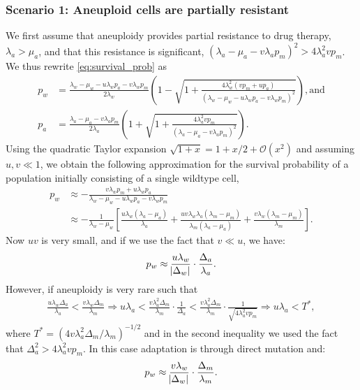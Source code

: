 \documentclass[12pt]{extarticle}
\begin{document}
\begin{appendices}
\subsubsection*{Scenario 1: Aneuploid cells are partially resistant} 

We first assume that aneuploidy provides partial resistance to drug therapy, $\lambda_a>\mu_a$, and that this resistance is significant, $\left(\lambda_a-\mu_a-v\lambda_ap_m\right)^2 > 4\lambda_a^2 v p_m$.
We thus rewrite \cref{eq:survival_prob} as
\begin{align*}
p_w&=\frac{\lambda_w-\mu_w-u\lambda_wp_a-v\lambda_wp_m}{2\lambda_w}\left(1-\sqrt{1+\frac{4\lambda_w^2\left(vp_m+up_a\right)}{\left(\lambda_w-\mu_w-u\lambda_wp_a-v\lambda_wp_m\right)^2}}\right) ,
\text{and} \\
p_a&=\frac{\lambda_a-\mu_a-v\lambda_ap_m}{2\lambda_a}\left(1+\sqrt{1+\frac{4\lambda_a^2vp_m}{\left(\lambda_a-\mu_a-v\lambda_ap_m\right)^2}}\right) . 
\end{align*}
Using the quadratic Taylor expansion $\sqrt{1+x}=1+x/2+\mathcal{O}(x^2)$ and assuming $u,v \ll 1$,
we obtain the following approximation for the survival probability of a population initially consisting of a single wildtype cell,
\begin{align} \label{eq:survprobwapprox1}
p_w 
&\approx -\frac{v\lambda_wp_m+u\lambda_wp_a}{\lambda_w-\mu_w-u\lambda_wp_a-v\lambda_wp_m}\\
\nonumber
&\approx-\frac{1}{\lambda_w-\mu_w}\left[\frac{u\lambda_w\left(\lambda_a-\mu_a\right)}{\lambda_a}+\frac{uv\lambda_w\lambda_a\left(\lambda_m-\mu_m\right)}{\lambda_m\left(\lambda_a-\mu_a\right)}+\frac{v\lambda_w\left(\lambda_m-\mu_m\right)}{\lambda_m}\right].
\end{align}
Now $u v$ is very small, and if we use the fact that $v \ll u$, we have:
\begin{equation}\label{eq:pw_parttolerant}
p_w \approx \frac{u\lambda_w}{\abs{\Delta_w}} \cdot \frac{\Delta_a}{\lambda_a} .
\end{equation}
However, if aneuploidy is very rare such that
\begin{align*}
\frac{u\lambda_w\Delta_a}{\lambda_a}<\frac{v\lambda_w\Delta_m}{\lambda_m}\Rightarrow u\lambda_a<\frac{v\lambda_a^2\Delta_m}{\lambda_m}\cdot\frac{1}{\Delta_a}<\frac{v\lambda_a^2\Delta_m}{\lambda_m}\cdot\frac{1}{\sqrt{4\lambda_a^2 v p_m}}\Rightarrow u\lambda_a<T^*,
\end{align*}
where $T^* = (4 v \lambda_a^2 \Delta_m/\lambda_m)^{-1/2}$ and in the second inequality we used the fact that $\Delta_a^2 > 4\lambda_a^2 v p_m$. In this case adaptation is through direct mutation and:
\begin{equation*}
p_w \approx \frac{v\lambda_w}{\abs{\Delta_w}} \cdot \frac{\Delta_m}{\lambda_m} .
\end{equation*}

\end{appendices}
\end{document}
